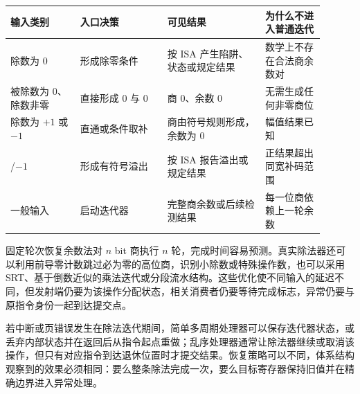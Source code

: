 \begin{longtable}{L{0.20\linewidth}L{0.25\linewidth}L{0.28\linewidth}L{0.17\linewidth}}
\toprule
输入类别 & 入口决策 & 可见结果 & 为什么不进入普通迭代 \\
\midrule
除数为 0 & 形成除零条件 & 按 ISA 产生陷阱、状态或规定结果 & 数学上不存在合法商余数对 \\
被除数为 0、除数非零 & 直接形成 0 与 0 & 商 0、余数 0 & 无需生成任何非零商位 \\
除数为 $+1$ 或 $-1$ & 直通或条件取补 & 商由符号规则形成，余数为 0 & 幅值结果已知 \\
/$-1$ & 形成有符号溢出 & 按 ISA 报告溢出或规定结果 & 正结果超出同宽补码范围 \\
一般输入 & 启动迭代器 & 完整商余数或后续检测结果 & 每一位商依赖上一轮余数 \\
\bottomrule
\end{longtable}


固定轮次恢复余数法对 $n$ bit 商执行 $n$ 轮，完成时间容易预测。真实除法器还可以利用前导零计数跳过必为零的高位商，识别小除数或特殊操作数，也可以采用 SRT、基于倒数近似的乘法迭代或分段流水结构。这些优化使不同输入的延迟不同，但发射端仍要为该操作分配状态，相关消费者仍要等待完成标志，异常仍要与原指令身份一起到达提交点。

若中断或页错误发生在除法迭代期间，简单多周期处理器可以保存迭代器状态，或丢弃内部状态并在返回后从指令起点重做；乱序处理器通常让除法器继续或取消该操作，但只有对应指令到达退休位置时才提交结果。恢复策略可以不同，体系结构观察到的效果必须相同：要么整条除法完成一次，要么目标寄存器保持旧值并在精确边界进入异常处理。
